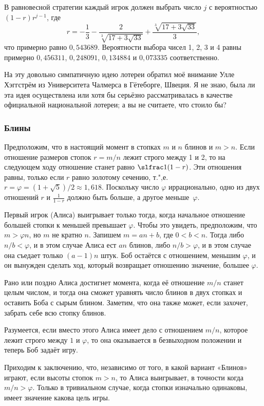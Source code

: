 \documentclass[twoside]{book}
\begin{document}
В равновесной стратегии каждый игрок должен выбрать число $j$ с вероятностью $(1-r)r^{j-1}$, где\vspace {-\jot}
\[r = -\frac13-\frac2{\sqrt[3]{17+3\sqrt{33}}}+\frac{\sqrt[3]{17+3\sqrt{33}}}3,\]
что примерно равно $0{,}543689$.
Вероятности выбора чисел 1, 2, 3 и 4 равны примерно $0{,}456311$, $0{,}248091$, $0{,}134884$ и $0{,}073335$ соответственно.

На эту довольно симпатичную идею лотереи обратил моё внимание Улле Хэггстрём из Университета Чалмерса в Гётеборге, Швеция. %
Я не знаю, была ли эта идея осуществлена или хотя бы серьёзно рассматривалась в качестве официальной национальной лотереи; а вы не считаете, что стоило бы?

\subsubsection*{Блины}%

Предположим, что в настоящий момент в стопках $m$ и $n$ блинов и $m > n$.
Если отношение размеров стопок $r = m/n$ лежит строго между 1 и 2, то на следующем ходу отношение станет равно $\slfrac1{(1-r)}$.
Эти отношения равны, только если $r$ равно золотому сечению,
т.",е. $r=\varphi=(1+\sqrt{5})/2\approx 1{,}618$.
Поскольку число $\varphi$ иррационально, одно из двух отношений $r$ и $\tfrac1{1-r}$ должно быть больше, а другое меньше~$\varphi$.

Первый игрок (Алиса) выигрывает только тогда, когда начальное отношение большей стопки к меньшей превышает $\varphi$.
Чтобы это увидеть, предположим, что $m>\varphi n$, но $m$ не кратно $n$.
Запишем $m=an+b$, где $0<b<n$.
Тогда либо $n/b<\varphi$, и в этом случае Алиса ест $an$ блинов, либо $n/b>\varphi$, и в этом случае она съедает только $(a-1)n$ штук.
Боб остаётся с отношением, меньшим $\varphi$, и он вынужден сделать ход, который возвращает отношению значение, большее $\varphi$.

Рано или поздно Алиса достигнет момента, когда её отношение $m/n$ станет целым числом, и тогда она сможет уравнять число блинов в двух стопках и оставить Боба с сырым блином.
Заметим, что она также может, если захочет, забрать себе всю стопку блинов.

Разумеется, если вместо этого Алиса имеет дело с отношением $m/n$, которое лежит строго между $1$ и $\varphi$, то она оказывается в безвыходном положении %
и теперь Боб задаёт игру.

Приходим к заключению, что, независимо от того, в какой вариант «Блинов» играют, если высоты стопок $m>n$, то Алиса выигрывает, в точности когда $m/n>\varphi$.
Только в тривиальном случае, когда стопки изначально одинаковы, имеет значение какова цель игры.\heart
\end{document}

